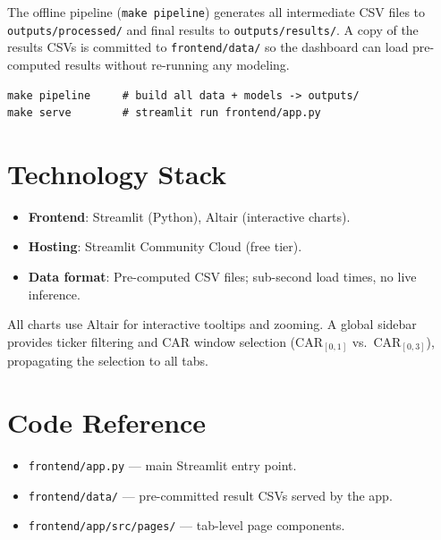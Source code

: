 \documentclass[12pt,a4paper]{article}
\begin{document}
The offline pipeline (\texttt{make pipeline}) generates all intermediate CSV files
to \texttt{outputs/processed/} and final results to \texttt{outputs/results/}.
A copy of the results CSVs is committed to \texttt{frontend/data/} so the dashboard
can load pre-computed results without re-running any modeling.

\begin{verbatim}
make pipeline     # build all data + models -> outputs/
make serve        # streamlit run frontend/app.py
\end{verbatim}

\section{Technology Stack}

\begin{itemize}
  \item \textbf{Frontend}: Streamlit (Python), Altair (interactive charts).
  \item \textbf{Hosting}: Streamlit Community Cloud (free tier).
  \item \textbf{Data format}: Pre-computed CSV files; sub-second load times,
        no live inference.
\end{itemize}

All charts use Altair for interactive tooltips and zooming.
A global sidebar provides ticker filtering and CAR window selection
(CAR$_{[0,1]}$ vs.\ CAR$_{[0,3]}$), propagating the selection to all tabs.

\section{Code Reference}

\begin{itemize}
  \item \texttt{frontend/app.py} --- main Streamlit entry point.
  \item \texttt{frontend/data/} --- pre-committed result CSVs served by the app.
  \item \texttt{frontend/app/src/pages/} --- tab-level page components.
\end{itemize}
\end{document}
